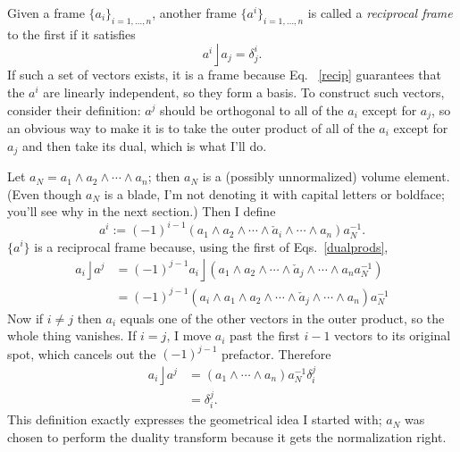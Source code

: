 \documentclass{utarticle}
\DeclareMathOperator{\lin}{\rfloor}
\DeclareMathOperator{\out}{\wedge}
\begin{document}
Given a frame $\{a_i\}_{i=1,\dotsc,n}$, another
frame $\{a^i\}_{i=1,\dotsc,n}$ is called a \emph{reciprocal frame} to
the first if it satisfies
\begin{equation} a^i \lin a_j = \delta^i_j. \label{recip} \end{equation}
If such a set of vectors exists, it is a frame because Eq.~
\eqref{recip} guarantees that the $a^i$ are linearly independent, so
they form a basis.  To construct such vectors, consider their definition: 
$a^j$ should be orthogonal to all of the $a_i$ except for $a_j$, so an 
obvious way to make it is to take the outer product of all of the $a_i$ 
except for $a_j$ and then take its dual, which is what I'll do.

Let $a_N = a_1 \out a_2 \out \dotsb \out a_n$; then $a_N$ is a 
(possibly unnormalized) volume element.  (Even though $a_N$ is a blade,
I'm not denoting it with capital letters or boldface; you'll see why in the 
next section.)  Then I define
\begin{equation}
a^i := (-1)^{i-1} (a_1 \out a_2 \out \dotsb \out \check{a}_i \out 
           \dotsb \out a_n) a_N^{-1}.
\label{definerecipvec}
\end{equation}
$\{a^i\}$ is a reciprocal frame because, using the first of Eqs.~\eqref{dualprods},
\begin{align}
a_i \lin a^j & = (-1)^{j-1} a_i \lin (a_1 \out a_2 \out \dotsb \out 
    \check{a}_j \out \dotsb \out a_n a_N^{-1}) \nonumber \\
 & = (-1)^{j-1} (a_i \out a_1 \out a_2 \out \dotsb \out 
    \check{a}_j \out \dotsb \out a_n) a_N^{-1}
\end{align}
Now if $i \ne j$ then $a_i$ equals one of the other vectors in the
outer product, so the whole thing vanishes.  If $i = j$, I move $a_i$ past
the first $i-1$ vectors to its original spot, which cancels out the $(-1)^{j-1}$ 
prefactor.  Therefore
\begin{align}
a_i \lin a^j & = (a_1 \out \dotsb \out a_n) a_N^{-1} \delta_i^j \nonumber \\
 & = \delta_i^j.
\end{align}
This definition exactly expresses the geometrical idea I started with;
$a_N$ was chosen to perform the duality transform because it gets
the normalization right.
\end{document}
